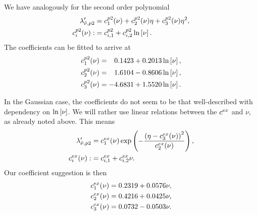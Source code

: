 \documentclass[8.5pt,twoside,twocolumn]{article}
\theoremstyle{standard}
\begin{document}
We have analogously for the second order polynomial
\begin{equation}
\begin{aligned}
\lambda_{\tilde \nu,{p2}}'&=c^{p2}_1(\nu)+c^{p2}_2(\nu)\eta+c^{p2}_3(\nu)\eta^2, \\
c^{p2}_i(\nu):&=c^{p2}_{i,1}+c^{p2}_{i,2}\ln\left[{\nu}\right].
\end{aligned}
\end{equation}
The coefficients can be fitted to arrive at
\begin{equation}
\begin{aligned}
c^\pt_1(\nu)&=\ph{-}0.1423+0.2013\ln\ed{\nu},\\
c^\pt_2(\nu)&=\ph{-}1.6104-0.8606\ln\ed{\nu},\\
c^\pt_3(\nu)&=-4.6831+1.5520\ln\ed{\nu}.
\end{aligned}
\end{equation}

In the Gaussian case, the coefficients do not seem to be that well-described with
dependency on $\ln\left[{\nu}\right]$. We will rather use linear relations between the $c^{ex}$ and
$\nu$, as already noted above. This means
\begin{equation}
\begin{aligned}
\lambda_{\tilde \nu,{p2}}'&=c_1^{ex}(\nu) \exp\left({-\frac{\left({\eta-c_3^{ex}(\nu)}\right)^2}{c_2^{ex}(\nu)}}\right),\\
c^{ex}_i(\nu):&=c^{ex}_{i,1}+c^{ex}_{i,2}\nu.
\end{aligned}
\end{equation}
Our coefficient suggestion is then
\begin{equation}
\begin{aligned}
c^{ex}_1(\nu)&=0.2319+0.0576\nu,\\
c^{ex}_2(\nu)&=0.4216+0.0425\nu,\\
c^{ex}_3(\nu)&=0.0732-0.0503\nu.
\end{aligned}
\end{equation}
\end{document}
